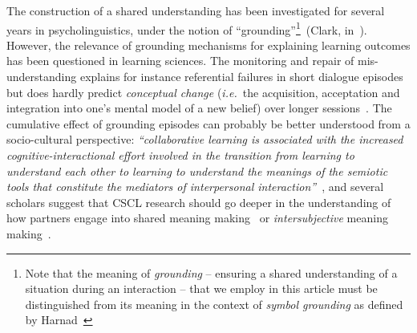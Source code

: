 \documentclass{sig-alternate}
\newcommand{\ie}{{\textit{i.e.~}}}
\begin{document}
The construction of a shared understanding has been investigated for several
years in psycholinguistics, under the  notion of ``grounding''\footnote{Note
that the meaning of \emph{grounding} -- ensuring a shared understanding of a
situation during an interaction -- that we employ in this article must be
distinguished from its meaning in the context of \emph{symbol grounding} as
defined by Harnad~\cite{harnad1990symbol}}~(Clark,
in~\cite{clark1986referring}).  However, the relevance of grounding mechanisms
for explaining learning outcomes has been questioned in learning sciences. The
monitoring and repair of mis-understanding explains for instance referential
failures in short dialogue episodes but does hardly predict \emph{conceptual
change} (\ie the acquisition, acceptation and integration into one's mental
model of a new belief) over longer
sessions~\cite{dillenbourg2006sharing}. The cumulative effect of grounding
episodes can probably be better understood from a socio-cultural perspective:
\emph{``collaborative learning is associated with the increased
cognitive-interactional effort involved in the transition from learning to
understand each other to learning to understand the meanings of the semiotic
tools that constitute the mediators of interpersonal
interaction''}~\cite{baker1999role}, and
several scholars suggest that CSCL research should go deeper in the
understanding of how partners engage into shared meaning
making~\cite{stahl2007meaning} or \emph{intersubjective} meaning
making~\cite{suthers2006technology}.
\end{document}
